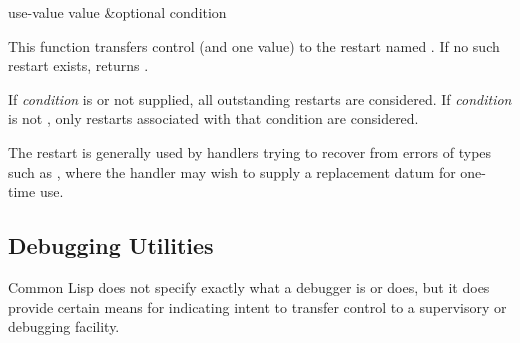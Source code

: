 \begin{defun}[Function]
use-value value &optional condition

  This function transfers control (and one value) to the restart named
  . If no such restart exists,  returns .
 
 If \emph{condition} is  or not supplied, all outstanding restarts
are considered.
If \emph{condition} is not , only restarts associated
with that condition are considered.

  The  restart is generally used by handlers trying to recover
  from errors of types such as , where the handler may wish to
  supply a replacement datum for one-time use.
\end{defun}


\subsection{Debugging Utilities}
\label{DEBUGGING-UTILITIES}

Common Lisp does not specify exactly what a debugger is or does,
but it does provide certain means for indicating intent to transfer control
to a supervisory or debugging facility.

